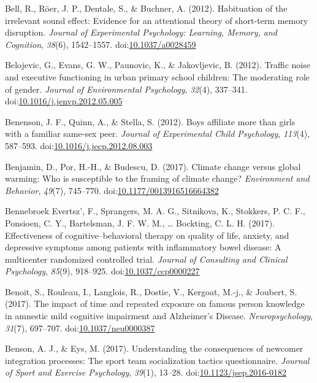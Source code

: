 \documentclass[english,man]{apa6}
\begin{document}
\hypertarget{ref-Bell2012a}{}
Bell, R., Röer, J. P., Dentale, S., \& Buchner, A. (2012). Habituation
of the irrelevant sound effect: Evidence for an attentional theory of
short-term memory disruption. \emph{Journal of Experimental Psychology:
Learning, Memory, and Cognition}, \emph{38}(6), 1542--1557.
doi:\href{https://doi.org/10.1037/a0028459}{10.1037/a0028459}

\hypertarget{ref-Belojevic2012}{}
Belojevic, G., Evans, G. W., Paunovic, K., \& Jakovljevic, B. (2012).
Traffic noise and executive functioning in urban primary school
children: The moderating role of gender. \emph{Journal of Environmental
Psychology}, \emph{32}(4), 337--341.
doi:\href{https://doi.org/10.1016/j.jenvp.2012.05.005}{10.1016/j.jenvp.2012.05.005}

\hypertarget{ref-Benenson2012}{}
Benenson, J. F., Quinn, A., \& Stella, S. (2012). Boys affiliate more
than girls with a familiar same-sex peer. \emph{Journal of Experimental
Child Psychology}, \emph{113}(4), 587--593.
doi:\href{https://doi.org/10.1016/j.jecp.2012.08.003}{10.1016/j.jecp.2012.08.003}

\hypertarget{ref-Benjamin2017}{}
Benjamin, D., Por, H.-H., \& Budescu, D. (2017). Climate change versus
global warming: Who is susceptible to the framing of climate change?
\emph{Environment and Behavior}, \emph{49}(7), 745--770.
doi:\href{https://doi.org/10.1177/0013916516664382}{10.1177/0013916516664382}

\hypertarget{ref-BennebroekEvertsz2017a}{}
Bennebroek Evertsz', F., Sprangers, M. A. G., Sitnikova, K., Stokkers,
P. C. F., Ponsioen, C. Y., Bartelsman, J. F. W. M., \ldots{} Bockting,
C. L. H. (2017). Effectiveness of cognitive--behavioral therapy on
quality of life, anxiety, and depressive symptoms among patients with
inflammatory bowel disease: A multicenter randomized controlled trial.
\emph{Journal of Consulting and Clinical Psychology}, \emph{85}(9),
918--925.
doi:\href{https://doi.org/10.1037/ccp0000227}{10.1037/ccp0000227}

\hypertarget{ref-Benoit2017}{}
Benoit, S., Rouleau, I., Langlois, R., Dostie, V., Kergoat, M.-j., \&
Joubert, S. (2017). The impact of time and repeated exposure on famous
person knowledge in amnestic mild cognitive impairment and Alzheimer's
Disease. \emph{Neuropsychology}, \emph{31}(7), 697--707.
doi:\href{https://doi.org/10.1037/neu0000387}{10.1037/neu0000387}

\hypertarget{ref-Benson2017}{}
Benson, A. J., \& Eys, M. (2017). Understanding the consequences of
newcomer integration processes: The sport team socialization tactics
questionnaire. \emph{Journal of Sport and Exercise Psychology},
\emph{39}(1), 13--28.
doi:\href{https://doi.org/10.1123/jsep.2016-0182}{10.1123/jsep.2016-0182}
\end{document}
